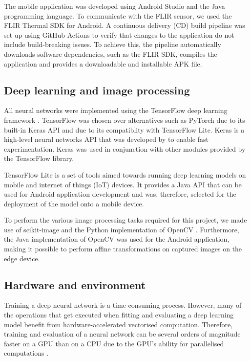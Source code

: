 \documentclass{l4proj}
\begin{document}
The mobile application was developed using Android Studio and the Java programming language. To communicate with the FLIR sensor, we used the FLIR Thermal SDK for Android. A continuous delivery (CD) build pipeline was set up using GitHub Actions to verify that changes to the application do not include build-breaking issues. To achieve this, the pipeline automatically downloads software dependencies, such as the FLIR SDK, compiles the application and provides a downloadable and installable APK file.

\subsection{Deep learning and image processing}

All neural networks were implemented using the TensorFlow deep learning framework \citep{abadi_TensorFlow_2016}. TensorFlow was chosen over alternatives such as PyTorch due to its built-in Keras API and due to its compatiblity with TensorFlow Lite. Keras is a high-level neural networks API that was developed by \citet{chollet_keras_2015} to enable fast experimentation. Keras was used in conjunction with other modules provided by the TensorFlow library. 

TensorFlow Lite is a set of tools aimed towards running deep learning models on mobile and internet of things (IoT) devices. It provides a Java API that can be used for Android application development and was, therefore, selected for the deployment of the model onto a mobile device.

To perform the various image processing tasks required for this project, we made use of scikit-image \citep{van_der_walt_scikit-image_2014} and the Python implementation of OpenCV \citep{bradski_opencv_2000}. Furthermore, the Java implementation of OpenCV was used for the Android application, making it possible to perform affine transformations on captured images on the edge device.

\subsection{Hardware and environment}

Training a deep neural network is a time-consuming process. However, many of the operations that get executed when fitting and evaluating a deep learning model benefit from hardware-accelerated vectorised computation. Therefore, training and evaluation of a neural network can be several orders of magnitude faster on a GPU than on a CPU due to the GPU's ability for parallelised computations \citep{shi_benchmarking_2016}. 
\end{document}
